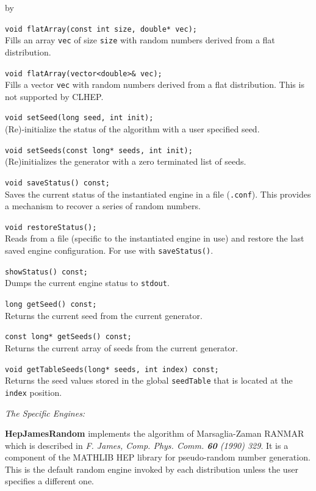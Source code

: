 \documentclass[twoside]{article}
\newcommand{\comp}[1]{\texttt{#1}}%
\newcommand{\entrylabel}[1]{\mbox{\textbf{{#1}}}\hfil}%
\newenvironment{entry}
{\begin{list}{}%
    {\renewcommand{\makelabel}{\entrylabel}%
     \setlength{\labelwidth}{90pt}%
     \setlength{\leftmargin}{\labelwidth}
     \advance\leftmargin by \labelsep%
      }%
    }%
  {\end{list}}
\newcommand{\Entrylabel}[1]%
{\raisebox{0pt}[1ex][0pt]{\makebox[\labelwidth][l]%
    {\parbox[t]{\labelwidth}{\hspace{0pt}\textbf{{#1}}}}}}
\newenvironment{Entry}%
{\renewcommand{\entrylabel}{\Entrylabel}\begin{entry}}%
  {\end{entry}}
\begin{document}
\begin{Entry}
     \verb+void flatArray(const int size, double* vec);+\\
     Fills an array \comp{vec} of size \comp{size} with random
     numbers derived from a flat distribution.

     \verb+void flatArray(vector<double>& vec);+\\
     Fills a vector \comp{vec} with random
     numbers derived from a flat distribution.  This is
     not supported by CLHEP.
     
     \verb+void setSeed(long seed, int init);+\\
     (Re)-initialize the status of the algorithm with a user specified
     seed.
     
     \verb+void setSeeds(const long* seeds, int init);+\\
     (Re)initializes the generator with a zero terminated list of seeds.
     
     \verb+void saveStatus() const;+\\
     Saves the current status of the instantiated engine
     in a file (\comp{.conf}).  This provides a mechanism
     to recover a series of random numbers.

     \verb+void restoreStatus();+ \\
     Reads from a file (specific to the instantiated engine in use)
     and restore the last saved engine configuration.  For use with
     \comp{saveStatus()}.

     \verb+showStatus() const;+\\
     Dumps the current engine status to \comp{stdout}.

     \verb+long getSeed() const;+\\
     Returns the current seed from the current generator.

     \verb+const long* getSeeds() const;+\\
     Returns the current array of seeds from the current generator.

     \verb+void getTableSeeds(long* seeds, int index) const;+\\
     Returns the seed values stored in the global \comp{seedTable}
     that is located at the \comp{index} position.

     {\em The Specific Engines:}
     
     \begin{description}
       \item {\bf HepJamesRandom} implements the algorithm of
       Marsaglia-Zaman RANMAR which is described in
       {\em F.  James, Comp. Phys. Comm. {\bf 60} (1990) 329}.  It is a
       component of the MATHLIB HEP library for pseudo-random
       number generation.  This is the default random engine invoked
       by each distribution unless the user specifies a different one.


\end{description}
\end{Entry}
\end{document}
